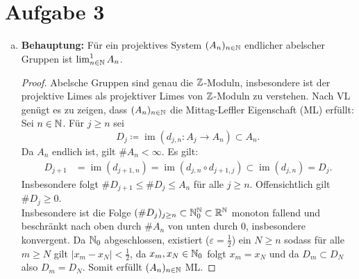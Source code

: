 \documentclass{nico_zettelsose21}
\renewcommand{\im}{\operatorname{im}}
\begin{document}
\section*{Aufgabe 3}
\begin{enumerate}[(a)]
    \item   \textbf{Behauptung:} Für ein projektives System $(A_{n})_{n \in \mathbb{N}}$ endlicher abelscher Gruppen ist $\lim_{n \in \mathbb{N}}^{1} A_{n}$.
            \begin{proof}
                Abelsche Gruppen sind genau die $\mathbb{Z}$-Moduln, insbesondere ist der projektive Limes als projektiver Limes von $\mathbb{Z}$-Moduln
                zu verstehen. Nach VL genügt es zu zeigen, dass $(A_{n})_{n \in \mathbb{N}}$ die Mittag-Leffler Eigenschaft (ML) erfüllt: \\
                Sei $n \in \mathbb{N}$. Für $j\geq n$ sei \[D_{j} \coloneqq \im(d_{j,n} \colon A_{j} \to A_{n}) \subset A_{n}.\]
                Da $A_{n}$ endlich ist, gilt $\# A_{n} < \infty$. Es gilt:
                \begin{align*}
                    D_{j+1} &= \im(d_{j+1,n}) = \im(d_{j,n} \circ d_{j+1,j}) \subset \im(d_{j,n}) = D_{j}.
                \end{align*}
                Insbesondere folgt $\# D_{j+1} \leq \# D_{j} \leq A_{n}$ für alle $j \geq n$. Offensichtlich gilt $\# D_{j} \geq 0$. \\
                Insbesondere ist die Folge $(\# D_{j})_{j \geq n} \subset \mathbb{N}_{0}^{\mathbb{N}} \subset \mathbb{R}^{\mathbb{N}}$ monoton fallend und beschränkt
                nach oben durch $\# A_{n}$ von unten durch $0$, insbesondere konvergent. Da $\mathbb{N}_{0}$ abgeschlossen, existiert 
                ($\varepsilon = \frac{1}{2}$) ein $N \geq n$ sodass für alle $m \geq N$ gilt $|x_{m} - x_{N}| < \frac{1}{2}$, da
                $x_{m},x_{N} \in \mathbb{N}_{0}$ folgt $x_{m} = x_{N}$ und da $D_{m} \subset D_{N}$ also $D_{m} = D_{N}$. 
                Somit erfüllt $(A_{n})_{n \in \mathbb{N}}$ ML.
            \end{proof} 
    

\end{enumerate}
\end{document}
